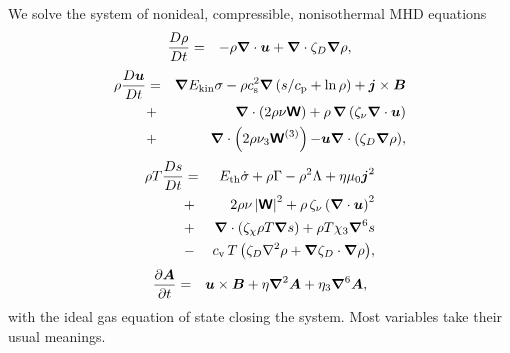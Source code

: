 \documentclass[preprint2]{aastex63}
\newcommand\ESK{E_{\rm kin}}
\newcommand\EST{E_{\rm th}}
\newcommand{\vect}[1]{{{\mbox{\boldmath $#1$}}}}%
\newcommand{\mathbfss}[1]{\textbf{\textsf{#1}}}
\begin{document}

 We solve the system of nonideal, compressible, nonisothermal MHD equations
  \begin{eqnarray}
  \label{eq:mass}
    \frac{D\rho}{Dt} &=& 
    -\rho \vect\nabla \cdot \vect{u}
    +\vect\nabla \cdot\zeta_D\vect\nabla\rho,
  \end{eqnarray}
  \begin{eqnarray}
  \label{eq:mom}
    \rho\frac{D\vect{u}}{Dt} &=& 
    \vect\nabla{\ESK\sigma}
    -\rho c_{\rm s}^2\vect\nabla\left({s}/{c_{\rm p}}+\ln\rho\right)
    +\vect{j}\times\vect{B}
    \nonumber\\
    &+&\vect\nabla\cdot \left(2\rho\nu{\mathbfss W}\right)
    +\rho\,\vect\nabla\left(\zeta_{\nu}\vect\nabla \cdot \vect{u} \right)
    \nonumber\\
    &+&\vect\nabla\cdot \left(2\rho\nu_3{\mathbfss W}^{(3)}\right)
  {-\vect u\vect{\nabla}\cdot\left(\zeta_D\vect{\nabla}\rho\right)},
  \end{eqnarray}
  \begin{eqnarray}
  \label{eq:ent}
    \rho T\frac{D s}{Dt} &=&
     \EST\dot\sigma +\rho\Gamma
    -\rho^2\Lambda +\eta\mu_0\vect{j}^2 
    \nonumber\\
    &+&2 \rho \nu\left|{\mathbfss W}\right|^{2}
    +\rho\,\zeta_{\nu}\left(\vect\nabla \cdot \vect{u} \right)^2
    \nonumber\\
    &+&\vect\nabla\cdot\left(\zeta_\chi\rho T\vect\nabla s\right)
    +\rho T\chi_3\vect\nabla^6 s
    \nonumber\\
    &-& {c_{\rm{v}}\,T \left(
    \zeta_D\nabla^2\rho + \vect\nabla\zeta_D\cdot\vect\nabla\rho\right)},
  \end{eqnarray}
  \begin{eqnarray}
  \label{eq:ind}
    \frac{\partial \vect{A}}{\partial t} &=&
    \vect{u}\times\vect{B}
    +\eta\vect\nabla^2\vect{A}
    +\eta_3\vect\nabla^6\vect{A},
  \end{eqnarray}
 with the ideal gas equation of state closing the system.
 Most variables take their usual meanings.
\end{document}
